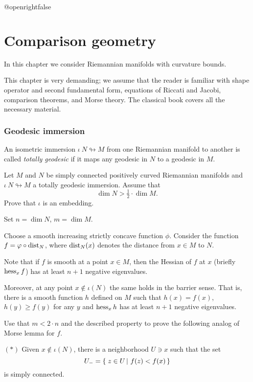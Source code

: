 \csname @openrightfalse\endcsname
\chapter{Comparison geometry}

In this chapter we consider Riemannian manifolds with curvature bounds.

This chapter is very demanding;
we assume that the reader is familiar with   
shape operator and second fundamental form, 
equations of Riccati and Jacobi,
comparison theorems,
and Morse theory.
The classical book \cite{cheeger-ebin} covers all the  necessary  material.

\subsection*{Geodesic immersion\hard}
\label{Geodesic immersion}

An isometric immersion $\iota\:N\looparrowright M$ from one Riemannian manifold to another is called \emph{totally geodesic} if it maps any geodesic in $N$ to a geodesic in $M$.

\begin{pr}
Let $M$ and $N$ be simply connected positively curved Riemannian manifolds and $\iota\:N\looparrowright M$ a totally geodesic immersion.
Assume that 
\[\dim N>\tfrac 12\cdot \dim M.\]
Prove that $\iota$ is an embedding.
\end{pr}

Set $n=\dim N$, $m=\dim M$.

Choose a smooth increasing strictly concave function $\phi$.
Consider the function $f=\varphi\circ\operatorname{\rm dist}\nolimits_N$,
where $\operatorname{\rm dist}\nolimits_N(x)$ denotes the distance from $x\in M$ to $N$.

Note that if $f$ is smooth at a point $x\in M$, then the Hessian of $f$ at $x$ (briefly $\operatorname{\rm hess}\nolimits_xf$) has at least $n+1$ negative eigenvalues.

Moreover, at any point $x\notin \iota(N)$ the same holds in the barrier sense\label{page:barrier sense}.
That is, there is a smooth function $h$ defined on $M$
such that $h(x)=f(x)$, $h(y)\ge f(y)$ for any $y$
and $\operatorname{\rm hess}\nolimits_xh$ has at least $n+1$ negative eigenvalues.

Use that $m< 2\cdot n$ and the described property to prove the following
analog of Morse lemma for $f$.

\begin{cl}{$({*})$}
 Given $x\notin \iota(N)$, there is a neighborhood $U\ni x$ such that the set 
\[U_-=\set{z\in U}{f(z)<f(x)}\] is simply connected.
\end{cl}

